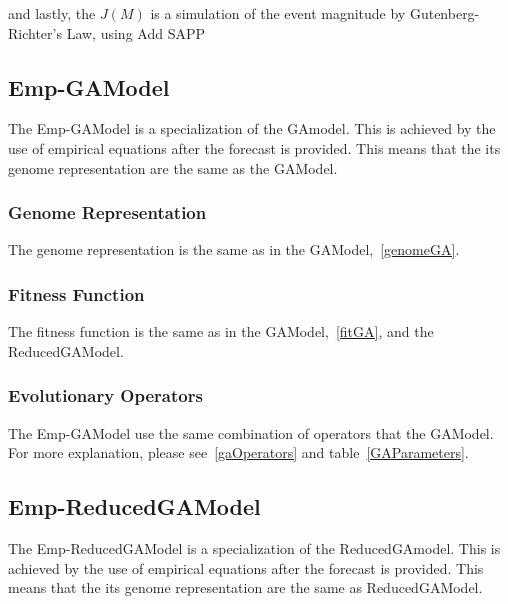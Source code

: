 and lastly, the $J(M)$ is a simulation of the event magnitude by
Gutenberg-Richter's Law, using Add SAPP\\
%


\subsection{Emp-GAModel}
The Emp-GAModel is a specialization of the GAmodel. This is achieved by the use of empirical equations after the forecast is provided. This means that the its genome representation are the same as the GAModel.\\
\subsubsection{Genome Representation}
The genome representation is the same as in the GAModel,~\ref{genomeGA}.\\

\subsubsection{Fitness Function}
The fitness function is the same as in the GAModel,~\ref{fitGA}, and the ReducedGAModel.\\
\subsubsection{Evolutionary Operators}
The Emp-GAModel use the same combination of operators that the GAModel. For more explanation, please see~\ref{gaOperators} and table~\ref{GAParameters}.\\

\subsection{Emp-ReducedGAModel}
The Emp-ReducedGAModel is a specialization of the ReducedGAmodel. This is achieved by the use of empirical equations after the forecast is provided. This means that the its genome representation are the same as ReducedGAModel.\\

